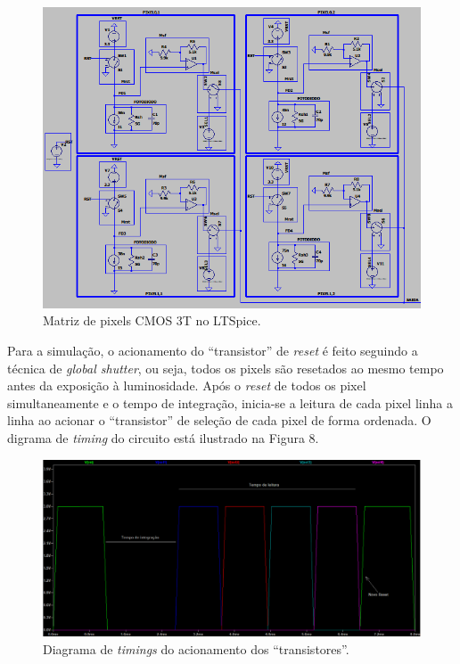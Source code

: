 \documentclass[10pt,a4paper,twocolumn]{article}
\begin{document}
	\begin{figure}[H]
	\centering
	\includegraphics[scale=0.4]{imagens/matriz_simulada.png}
	\caption{Matriz de pixels CMOS 3T no LTSpice.}	
	\end{figure}

	Para a simulação, o acionamento do ``transistor'' de \textit{reset} é feito seguindo a técnica de \textit{global shutter}, ou seja, todos os pixels são resetados ao mesmo tempo antes da exposição à luminosidade. Após o \textit{reset} de todos os pixel simultaneamente e o tempo de integração, inicia-se a leitura de cada pixel linha a linha ao acionar o ``transistor'' de seleção de cada pixel de forma ordenada. O digrama de \textit{timing} do circuito está ilustrado na Figura 8.
	
	\begin{figure}[H]
	\centering
	\includegraphics[scale=0.258]{imagens/timings.png}
	\caption{Diagrama de \textit{timings} do acionamento dos ``transistores''.}
	\end{figure}
\end{document}
